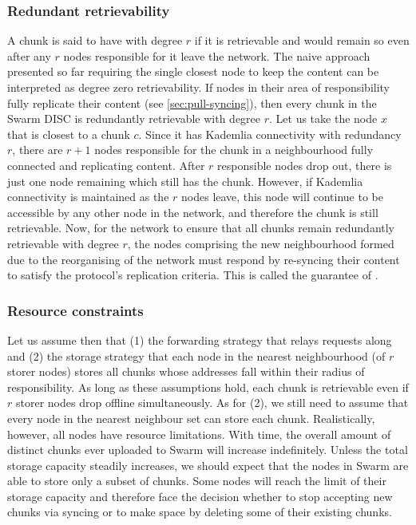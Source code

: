 \subsubsection{Redundant retrievability}

A chunk is said to have  with degree $r$ if it is retrievable and would remain so even after any $r$ nodes responsible for it leave the network. The naive approach presented so far requiring the single closest node to keep the content can be interpreted as degree zero retrievability. If nodes in their area of responsibility fully replicate their content (see \ref{sec:pull-syncing}), then every chunk in the Swarm DISC is redundantly retrievable with degree $r$. Let us take the node $x$ that is closest to a chunk $c$. Since it has Kademlia connectivity with redundancy $r$, there are $r+1$ nodes responsible for the chunk in a neighbourhood fully connected and replicating content. After $r$ responsible nodes drop out, there is just one node remaining which still has the chunk. However, if Kademlia connectivity is maintained as the $r$ nodes leave, this node will continue to be accessible by any other node in the network, and therefore the chunk is still retrievable. Now, for the network to ensure that all chunks remain redundantly retrievable with degree $r$, the nodes comprising the new neighbourhood formed due to the reorganising of the network must respond by re-syncing their content to satisfy the protocol's replication criteria. This is called the guarantee of .

\subsubsection{Resource constraints}

Let us assume then that (1) the forwarding strategy that relays requests along  and (2) the storage strategy that each node in the nearest neighbourhood (of $r$ storer nodes) stores all chunks whose addresses fall within their radius of responsibility. As long as these assumptions hold, each chunk is retrievable even if $r$ storer nodes drop offline simultaneously. As for (2), we still need to assume that every node in the nearest neighbour set can store each chunk. Realistically, however, all nodes have resource limitations. With time, the overall amount of distinct chunks ever uploaded to Swarm will increase indefinitely. Unless the total storage capacity steadily increases, we should expect that the nodes in Swarm are able to store only a subset of chunks. Some nodes will reach the limit of their storage capacity and therefore face the decision whether to stop accepting new chunks via syncing or to make space by deleting some of their existing chunks. 

